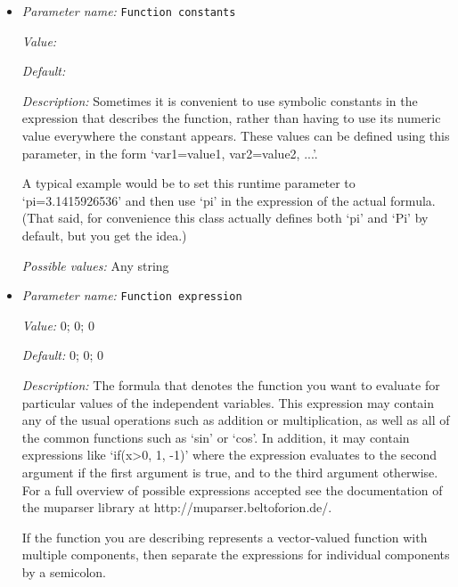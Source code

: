 \begin{itemize}
\item {\it Parameter name:} {\tt Function constants}
\label{parameters:Prescribed Stokes solution/Velocity function/Function constants}
\label{parameters:Prescribed_20Stokes_20solution/Velocity_20function/Function_20constants}


{\it Value:} 


{\it Default:} 


{\it Description:} Sometimes it is convenient to use symbolic constants in the expression that describes the function, rather than having to use its numeric value everywhere the constant appears. These values can be defined using this parameter, in the form `var1=value1, var2=value2, ...'.

A typical example would be to set this runtime parameter to `pi=3.1415926536' and then use `pi' in the expression of the actual formula. (That said, for convenience this class actually defines both `pi' and `Pi' by default, but you get the idea.)


{\it Possible values:} Any string
\item {\it Parameter name:} {\tt Function expression}
\label{parameters:Prescribed Stokes solution/Velocity function/Function expression}
\label{parameters:Prescribed_20Stokes_20solution/Velocity_20function/Function_20expression}


{\it Value:} 0; 0; 0


{\it Default:} 0; 0; 0


{\it Description:} The formula that denotes the function you want to evaluate for particular values of the independent variables. This expression may contain any of the usual operations such as addition or multiplication, as well as all of the common functions such as `sin' or `cos'. In addition, it may contain expressions like `if(x>0, 1, -1)' where the expression evaluates to the second argument if the first argument is true, and to the third argument otherwise. For a full overview of possible expressions accepted see the documentation of the muparser library at http://muparser.beltoforion.de/.

If the function you are describing represents a vector-valued function with multiple components, then separate the expressions for individual components by a semicolon.



\end{itemize}
